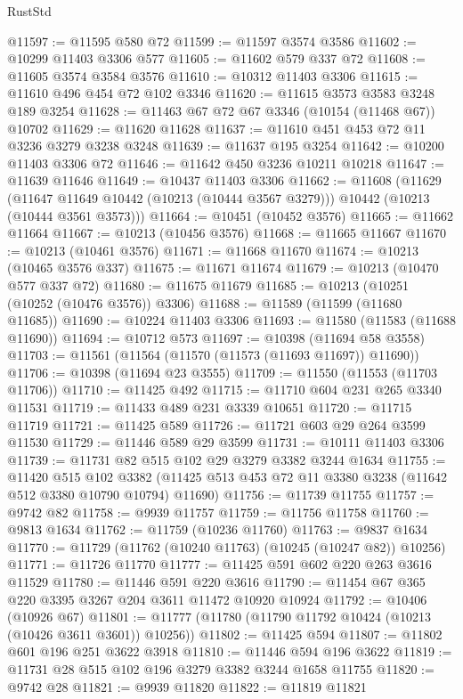 \begin{lexlean}{RustStd}
\begin{coremodule}
{\begin{coremodule}
{{{{{{{{{{{{{{{{{{{{{{{{{{@11597 := @11595 @580 @72
@11599 := @11597 @3574 @3586
@11602 := @10299 @11403 @3306 @577
@11605 := @11602 @579 @337 @72
@11608 := @11605 @3574 @3584 @3576
@11610 := @10312 @11403 @3306
@11615 := @11610 @496 @454 @72 @102 @3346
@11620 := @11615 @3573 @3583 @3248 @189 @3254
@11628 := @11463 @67 @72 @67 @3346 (@10154 (@11468 @67)) @10702
@11629 := @11620 @11628
@11637 := @11610 @451 @453 @72 @11 @3236 @3279 @3238 @3248
@11639 := @11637 @195 @3254
@11642 := @10200 @11403 @3306 @72
@11646 := @11642 @450 @3236 @10211 @10218
@11647 := @11639 @11646
@11649 := @10437 @11403 @3306
@11662 := @11608
    (@11629
      (@11647 @11649 @10442 (@10213 (@10444 @3567 @3279)))
      @10442
      (@10213 (@10444 @3561 @3573)))
@11664 := @10451 (@10452 @3576)
@11665 := @11662 @11664
@11667 := @10213 (@10456 @3576)
@11668 := @11665 @11667
@11670 := @10213 (@10461 @3576)
@11671 := @11668 @11670
@11674 := @10213 (@10465 @3576 @337)
@11675 := @11671 @11674
@11679 := @10213 (@10470 @577 @337 @72)
@11680 := @11675 @11679
@11685 := @10213 (@10251 (@10252 (@10476 @3576)) @3306)
@11688 := @11589 (@11599 (@11680 @11685))
@11690 := @10224 @11403 @3306
@11693 := @11580 (@11583 (@11688 @11690))
@11694 := @10712 @573
@11697 := @10398 (@11694 @58 @3558)
@11703 := @11561 (@11564 (@11570 (@11573 (@11693 @11697)) @11690))
@11706 := @10398 (@11694 @23 @3555)
@11709 := @11550 (@11553 (@11703 @11706))
@11710 := @11425 @492
@11715 := @11710 @604 @231 @265 @3340 @11531
@11719 := @11433 @489 @231 @3339 @10651
@11720 := @11715 @11719
@11721 := @11425 @589
@11726 := @11721 @603 @29 @264 @3599 @11530
@11729 := @11446 @589 @29 @3599
@11731 := @10111 @11403 @3306
@11739 := @11731 @82 @515 @102 @29 @3279 @3382 @3244 @1634
@11755 := @11420
    @515
    @102
    @3382
    (@11425 @513 @453 @72 @11 @3380 @3238 (@11642 @512 @3380 @10790 @10794) @11690)
@11756 := @11739 @11755
@11757 := @9742 @82
@11758 := @9939 @11757
@11759 := @11756 @11758
@11760 := @9813 @1634
@11762 := @11759 (@10236 @11760)
@11763 := @9837 @1634
@11770 := @11729 (@11762 (@10240 @11763) (@10245 (@10247 @82)) @10256)
@11771 := @11726 @11770
@11777 := @11425 @591 @602 @220 @263 @3616 @11529
@11780 := @11446 @591 @220 @3616
@11790 := @11454 @67 @365 @220 @3395 @3267 @204 @3611 @11472 @10920 @10924
@11792 := @10406 (@10926 @67)
@11801 := @11777 (@11780 (@11790 @11792 @10424 (@10213 (@10426 @3611 @3601)) @10256))
@11802 := @11425 @594
@11807 := @11802 @601 @196 @251 @3622 @3918
@11810 := @11446 @594 @196 @3622
@11819 := @11731 @28 @515 @102 @196 @3279 @3382 @3244 @1658 @11755
@11820 := @9742 @28
@11821 := @9939 @11820
@11822 := @11819 @11821
}}}}}}}}}}}}}}}}}}}}}}}}}}
\end{coremodule}}
\end{coremodule}
\end{lexlean}
